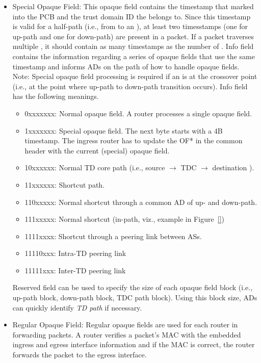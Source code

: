 \begin{itemize}
\item{Special Opaque Field: }This opaque field contains the timestamp that \TDC \AD marked into the PCB and the trust domain ID the \AD belongs to. Since this timestamp is valid for a half-path (i.e., from \TDC to an \STUB \AD), at least two timesstamps (one for up-path and one for down-path) are present in a packet. If a packet traverses multiple \TDs, it should contain as many timestamps as the number of \TDs. Info field contains the information regarding a series of opaque fields that use the same timestamp and informs ADs on the path of how to handle opaque fields. Note: Special opaque field processing is required if an \AD is at the crossover point (i.e., at the point where up-path to down-path transition occurs). Info field has the following meanings.
	\begin{itemize}
	\item{0xxxxxxx}: Normal opaque field. A router processes a single opaque field.
	\item{1xxxxxxx}: Special opaque field. The next byte starts with a 4B timestamp. The ingress router has to update the OF* in the common header with the current (special) opaque field.
	\item{10xxxxxx}: Normal TD core path (i.e., source \AD $\rightarrow$ TDC $\rightarrow$ destination \AD).
	\item{11xxxxxx}: Shortcut path.
	\item{110xxxxx}: Normal shortcut through a common AD of up- and down-path.
	\item{111xxxxx}: Normal shortcut (in-path, viz., example in Figure~\ref{})
	\item{1111xxxx}: Shortcut through a peering link between ASs.
	\item{11110xxx}: Intra-TD peering link
	\item{11111xxx}: Inter-TD peering link
	\end{itemize}
Reserved field can be used to specify the size of each opaque field block (i.e., up-path block, down-path block, TDC path block). Using this block size, ADs can quickly identify {\em TD path} if necessary.
\item{Regular Opaque Field: }Regular opaque fields are used for each router in forwarding packets. A router verifies a packet's MAC with the embedded ingress and egress interface information and if the MAC is correct, the router forwards the packet to the egress interface.
	\begin{itemize}

\end{itemize}
\end{itemize}
